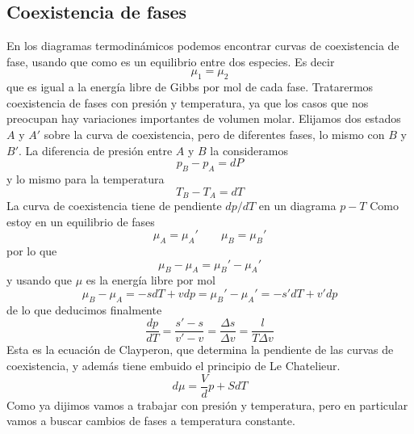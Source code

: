 \subsection{Coexistencia de fases}
En los diagramas termodinámicos podemos encontrar curvas de coexistencia de fase, usando que como es un equilibrio entre dos especies.
Es decir
\[\mu_{1} = \mu_{2}\]
que es igual a la energía libre de Gibbs por mol de cada fase.
Tratarermos coexistencia de fases con presión y temperatura, ya que los casos que nos preocupan hay variaciones importantes de volumen molar.
Elijamos dos estados $A$ y $A'$ sobre la curva de coexistencia, pero de diferentes fases, lo mismo con $B$ y $B'$.
La diferencia de presión entre $A$ y $B$ la consideramos
\[p_B - p_A = dP\]
y lo mismo para la temperatura
\[T_B - T_A = dT\]
La curva de coexistencia tiene de pendiente $dp/dT$ en un diagrama $p-T$
Como estoy en un equilibrio de fases
\[\mu_A = \mu_A' \qquad \mu_B = \mu_B'\]
por lo que
\[\mu_B - \mu_A = \mu_B' - \mu_A'\]
y usando que $\mu$ es la energía libre por mol
\[\mu_B - \mu_A = -s dT + v dp = \mu_B' - \mu_A' = -s' dT + v' dp\]
de lo que deducimos finalmente
\begin{equation}
\frac{dp}{dT} = \frac{s' - s}{v' - v} = \frac{\Delta s}{\Delta v} = \frac{l}{T \Delta v}
\label{eq:clausius_clayperon}
\end{equation}
Esta es la ecuación de Clayperon, que determina la pendiente de las curvas de coexistencia, y además tiene embuido el principio de Le Chatelieur.
\[d\mu = \frac{V} dp + S dT\]
Como ya dijimos vamos a trabajar con presión y temperatura, pero en particular vamos a buscar cambios de fases a temperatura constante.
